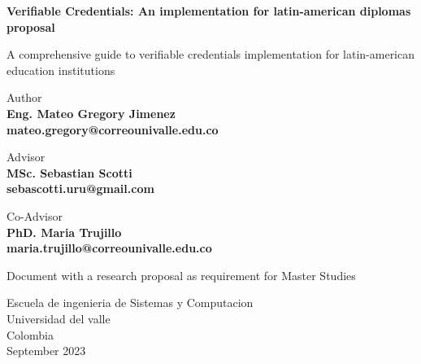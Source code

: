 \begin{titlepage}
    \begin{center}
        \vspace*{1cm}

        \huge
        \textbf{Verifiable Credentials: An implementation for latin-american diplomas proposal}

        \vspace{0.5cm}
        \large
        A comprehensive guide to verifiable credentials implementation for latin-american education institutions

        \vspace{1.5cm}

        Author\\
        \textbf{Eng. Mateo Gregory Jimenez}\\
        \textbf{mateo.gregory@correounivalle.edu.co}

        \vspace{1cm}
        
        Advisor\\
        \textbf{MSc. Sebastian Scotti}\\
        \textbf{sebascotti.uru@gmail.com}

        \vspace{1cm}
        
        Co-Advisor\\
        \textbf{PhD. Maria Trujillo}\\
        \textbf{maria.trujillo@correounivalle.edu.co}

        \vfil
        
        Document with a research proposal as requirement for Master Studies
        
        \vspace{0.8cm}

        Escuela de ingenieria de Sistemas y Computacion\\
        Universidad del valle\\
        Colombia\\
        September 2023
    \end{center}
\end{titlepage}
